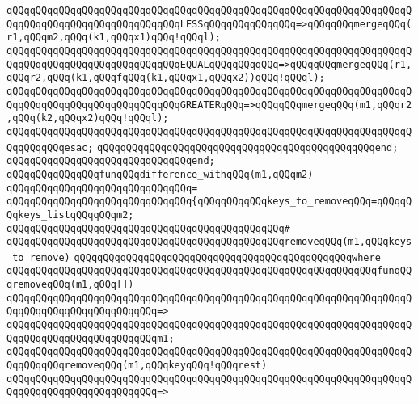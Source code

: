 \verb|qQQqqQQqqQQqqQQqqQQqqQQqqQQqqQQqqQQqqQQqqQQqqQQqqQQqqQQqqQQqqQQqqQQqqQQqqQQqqQQqqQQqqQQqqQQqqQQqqQQqLESSqQQqqQQqqQQqqQQq=>qQQqqQQqmergeqQQq(r1,qQQqm2,qQQq(k1,qQQqx1)qQQq!qQQql);|\newline
\verb|qQQqqQQqqQQqqQQqqQQqqQQqqQQqqQQqqQQqqQQqqQQqqQQqqQQqqQQqqQQqqQQqqQQqqQQqqQQqqQQqqQQqqQQqqQQqqQQqqQQqEQUALqQQqqQQqqQQq=>qQQqqQQqmergeqQQq(r1,qQQqr2,qQQq(k1,qQQqfqQQq(k1,qQQqx1,qQQqx2))qQQq!qQQql);|\newline
\verb|qQQqqQQqqQQqqQQqqQQqqQQqqQQqqQQqqQQqqQQqqQQqqQQqqQQqqQQqqQQqqQQqqQQqqQQqqQQqqQQqqQQqqQQqqQQqqQQqqQQqGREATERqQQq=>qQQqqQQqmergeqQQq(m1,qQQqr2,qQQq(k2,qQQqx2)qQQq!qQQql);|\newline
\verb|qQQqqQQqqQQqqQQqqQQqqQQqqQQqqQQqqQQqqQQqqQQqqQQqqQQqqQQqqQQqqQQqqQQqqQQqqQQqqQQqesac;|\newline
\verb|qQQqqQQqqQQqqQQqqQQqqQQqqQQqqQQqqQQqqQQqqQQqqQQqend;|\newline
\verb|qQQqqQQqqQQqqQQqqQQqqQQqqQQqqQQqend;|\newline
\newline
\verb|qQQqqQQqqQQqqQQqfunqQQqdifference_withqQQq(m1,qQQqm2)|\newline
\verb|qQQqqQQqqQQqqQQqqQQqqQQqqQQqqQQq=|\newline
\verb|qQQqqQQqqQQqqQQqqQQqqQQqqQQqqQQq{qQQqqQQqqQQqkeys_to_removeqQQq=qQQqqQQqkeys_listqQQqqQQqm2;|\newline
\verb|qQQqqQQqqQQqqQQqqQQqqQQqqQQqqQQqqQQqqQQqqQQqqQQq#|\newline
\verb|qQQqqQQqqQQqqQQqqQQqqQQqqQQqqQQqqQQqqQQqqQQqqQQqremoveqQQq(m1,qQQqkeys_to_remove)|\newline
\verb|qQQqqQQqqQQqqQQqqQQqqQQqqQQqqQQqqQQqqQQqqQQqqQQqwhere|\newline
\verb|qQQqqQQqqQQqqQQqqQQqqQQqqQQqqQQqqQQqqQQqqQQqqQQqqQQqqQQqqQQqqQQqfunqQQqremoveqQQq(m1,qQQq[])|\newline
\verb|qQQqqQQqqQQqqQQqqQQqqQQqqQQqqQQqqQQqqQQqqQQqqQQqqQQqqQQqqQQqqQQqqQQqqQQqqQQqqQQqqQQqqQQqqQQqqQQq=>|\newline
\verb|qQQqqQQqqQQqqQQqqQQqqQQqqQQqqQQqqQQqqQQqqQQqqQQqqQQqqQQqqQQqqQQqqQQqqQQqqQQqqQQqqQQqqQQqqQQqqQQqm1;|\newline
\newline
\verb|qQQqqQQqqQQqqQQqqQQqqQQqqQQqqQQqqQQqqQQqqQQqqQQqqQQqqQQqqQQqqQQqqQQqqQQqqQQqqQQqremoveqQQq(m1,qQQqkeyqQQq!qQQqrest)|\newline
\verb|qQQqqQQqqQQqqQQqqQQqqQQqqQQqqQQqqQQqqQQqqQQqqQQqqQQqqQQqqQQqqQQqqQQqqQQqqQQqqQQqqQQqqQQqqQQqqQQq=>|\newline
